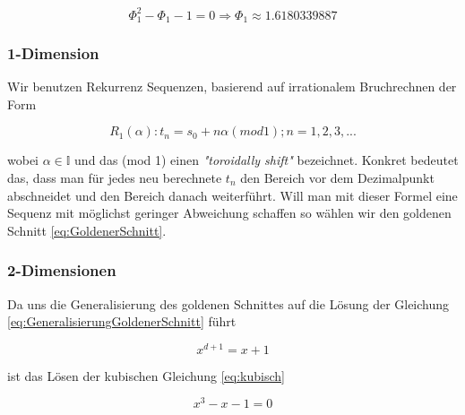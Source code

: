 \begin{tcolorbox}[rightrule=3mm, rounded corners=east]
    \begin{equation}\label{eq:GoldenerSchnitt}
        \Phi_{1}^{2} - \Phi_{1} - 1 = 0 \Longrightarrow \Phi_{1} \approx 1.6180339887
    \end{equation}
\end{tcolorbox}

\label{subsec:1-Dimension}
\subsubsection{1-Dimension}
Wir benutzen Rekurrenz Sequenzen, basierend auf irrationalem 
Bruchrechnen der Form

\begin{tcolorbox}[rightrule=3mm, rounded corners=east]
    \begin{equation}\label{eq:Rekurrenz Sequenz}
        R_{1}(\alpha) : t_n = s_0 + n\alpha(mod 1); n = 1,2,3,...
    \end{equation}
\end{tcolorbox}

wobei $\alpha \in \mathbb{I}$ und das (mod 1) einen \textit{"toroidally shift"}
bezeichnet. Konkret bedeutet das, dass man für jedes neu berechnete $t_{n}$ den Bereich vor dem Dezimalpunkt abschneidet 
und den Bereich danach weiterführt. Will man mit dieser Formel eine Sequenz mit möglichst geringer
Abweichung schaffen so wählen wir den goldenen Schnitt \ref{eq:GoldenerSchnitt}.

\label{subsec:2-Dimensionen}
\subsubsection{2-Dimensionen}

Da uns die Generalisierung des goldenen Schnittes auf die Lösung der Gleichung
\ref{eq:GeneralisierungGoldenerSchnitt} führt

\begin{tcolorbox}[rightrule=3mm, rounded corners=east]
    \begin{equation}\label{eq:GeneralisierungGoldenerSchnitt}
        x^{d+1} = x+1
    \end{equation}
\end{tcolorbox}

ist das Lösen der kubischen Gleichung \ref{eq:kubisch}

\begin{tcolorbox}[rightrule=3mm, rounded corners=east]
    \begin{equation}\label{eq:kubisch}
        x^{3} - x - 1 = 0
    \end{equation}
\end{tcolorbox}

